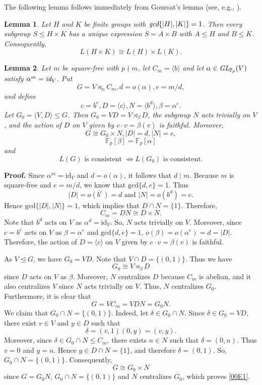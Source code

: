 \documentclass[12pt]{article}
\newtheorem{lemma}{\bf Lemma}[section]
\def\proof{{\bf Proof.} }
\begin{document}
The following lemma follows immediately from Goursat's lemma 
(see, e.g., \cite{Schmidt}). 
\begin{lemma}\label{LeM+1}
Let $H$ and $K$ be finite groups with $\emph{gcd}\{|H|, |K|\}=1$. Then every subgroup $S\leq H\times K$ has a unique expression $S=A\times B$ with $A\leq H$ and $B\leq K$. 
Consequently, $$L(H\times K)\cong L(H)\times L(K).$$   
\end{lemma}

\begin{lemma}\label{L4.1}
Let $m$ be square-free with $p\nmid m$, let $C_m=\langle b\rangle$ and let $\alpha\in \emph{GL}_{\mathbb{F}_p}(V)$ satisfy $\alpha^m=\emph{id}_V$. Put 
$$G=V\rtimes_{\alpha} C_m, d=o(\alpha), e=m/d, $$ and define $$c=b^e, D=\langle c\rangle, N=\langle b^d\rangle, \beta=\alpha^e.$$ 
Let $G_0=\langle V, D\rangle\leq G$. Then $G_0=VD=V\rtimes_\beta D$, the subgroup
$N$ acts trivially on $V$, and the action of $D$ on $V$ given by $c\cdot v=\beta(v)$ is faithful. 
Moreover, \begin{equation}\label{00E1}
G\cong G_0\times N, |D|=d, |N|=e,   
\end{equation}
\begin{equation}\label{00E2}
\mathbb{F}_p[\beta]=\mathbb{F}_p[\alpha]   
\end{equation}
and
\begin{equation}\label{00E3}
L(G)\mbox{ is consistent } \Longleftrightarrow
L(G_0)\mbox{ is consistent}.
\end{equation}
\end{lemma}
\proof 
Since $\alpha^m=\mbox{id}_V$ and $d=o(\alpha)$, 
it follows that $d\mid m$. Because $m$ is square-free 
and $e=m/d$, we know that $\mbox{gcd}\{d,e\}=1$. 
Thus $$|D|=o(b^e)=d \mbox{ and } |N|=o(b^d)=e.$$
Hence $\mbox{gcd}\{|D|,|N|\}=1$, which implies that 
$D\cap N=\{1\}$. Therefore, $$C_m=DN\cong D\times N.$$
Note that $b^d$ acts on $V$ as $\alpha^d=\mbox{id}_V$. 
So, $N$ acts trivially on $V$. Moreover, since $c=b^e$ 
acts on $V$ as $\beta=\alpha^e$ and $\mbox{gcd}\{d,e\}=1$, $o(\beta)=o(\alpha^e)=d=|D|$. 
Therefore, the action of $D=\langle c\rangle$ 
on $V$ given by $c\cdot v=\beta(v)$ is faithful.

As $V\unlhd G$, we have $G_0=VD$. Note that $V\cap D=\{(0,1)\}$. 
Thus we have $$G_0\cong V\rtimes_{\beta}D$$ 
since $D$ acts on $V$ as $\beta$.
Moreover, $N$ centralizes $D$ because $C_m$ is abelian, 
and it also centralizes $V$ since $N$ acts trivially on $V$. 
Thus, $N$ centralizes $G_0$. Furthermore, it is clear that 
$$G=VC_m=VDN=G_0N.$$
We claim that $G_0\cap N=\{(0,1)\}$. Indeed, let $\delta\in G_0\cap N$. 
Since $\delta\in G_0=VD$, there exist $v\in V$ and $y\in D$ such that 
$$\delta=(v,1)(0,y)=(v,y).$$ Moreover, since $\delta\in G_0\cap N\leq C_m$, 
there exists $n\in N$ such that $\delta=(0,n)$. Thus $v=0$ and $y=n$. 
Hence $y\in D\cap N=\{1\}$, and therefore $\delta=(0,1)$.
So, $G_0\cap N=\{(0,1)\}$. Consequently,
$$G\cong G_0\times N$$ since 
$G=G_0N$, $G_0\cap N=\{(0,1)\}$ and $N$ centralizes $G_0$,
which proves \eqref{00E1}.
\end{document}
